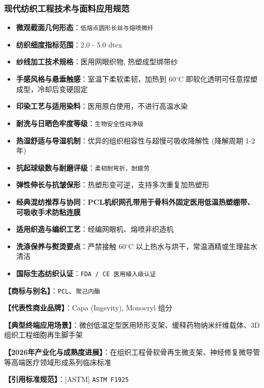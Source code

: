 \documentclass[11pt,openright,twoside,UTF8]{ctexbook}
\begin{document}
\subsubsection*{现代纺织工程技术与面料应用规范}
\begin{itemize} \setlength{\itemsep}{2pt}
    \item \textbf{微观截面几何形态}：\texttt{低熔点圆形长丝与熔喷微纤}
    \item \textbf{纺织细度指标范围}：2.0 - 5.0 dtex
    \item \textbf{纱线加工技术规格}：医用网眼织物, 热塑成型绑带纱
    \item \textbf{手感风格与悬垂触感}：室温下柔软柔韧，加热到 60$^\circ\mathrm{C}$ 即软化透明可任意捏塑成型，冷却后变硬固定
    \item \textbf{印染工艺与适用染料}：医用原白使用，不进行高温水染
    \item \textbf{耐洗与日晒色牢度等级}：\texttt{生物安全性纯净级}
    \item \textbf{热湿舒适与导湿机制}：优异的组织相容性与超慢可吸收降解性 (降解周期 1-2 年)
    \item \textbf{抗起球级数与耐磨评级}：\texttt{柔韧耐弯折，耐疲劳}
    \item \textbf{弹性伸长与抗皱保形}：热塑形变可逆，支持多次重复加热塑形
    \item \textbf{经典混纺推荐与协同}：\textbf{PCL机织网孔带用于骨科外固定医用低温热塑绷带、可吸收手术防粘连膜}
    \item \textbf{适用织造与编织工艺}：经编网眼机、熔喷非织造机
    \item \textbf{洗涤保养与熨烫要点}：严禁接触 60$^\circ\mathrm{C}$ 以上热水与烘干，常温酒精或生理盐水清洁
    \item \textbf{国际生态纺织认证}：\texttt{FDA / CE 医用植入级认证}
\end{itemize}
\vspace{0.2cm}

\noindent\textbf{【商标与别名】}：\texttt{PCL}、\texttt{聚己内酯}\par
\noindent\textbf{【代表性商业品牌】}：Capa (Ingevity), Monocryl 组分\par
\noindent\textbf{【典型终端应用场景】}：微创低温定型医用矫形支架、缓释药物纳米纤维载体、3D组织工程细胞再生脚手架\par
\noindent\textbf{【2026年产业化与成熟度进展】}：在组织工程骨软骨再生微支架、神经修复微导管等高端医疗领域形成系列临床标准\par
\noindent\textbf{【引用标准规范】}：[ASTM] \texttt{ASTM F1925}\par
\vspace{0.5cm}
\end{document}
